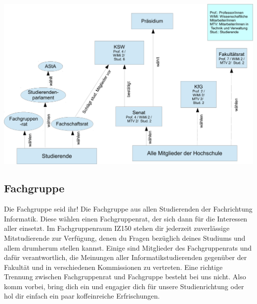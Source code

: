 \begin{center}
	\includegraphics[angle=90]{bilder/gremienkunde3}
\end{center}
\newpage
\subsection{Fachgruppe}
	\label{fachgruppe}
	Die Fachgruppe seid ihr! Die Fachgruppe aus allen Studierenden der Fachrichtung Informatik. Diese wählen einen Fachgruppenrat, der sich dann für die Interessen aller einsetzt. 
	Im Fachgruppenraum IZ150 stehen dir jederzeit zuverlässige Mitstudierende zur Verfügung, denen du Fragen bezüglich deines Studiums und allem drumherum stellen kannst. Einige sind Mitglieder des Fachgruppenrats und dafür verantwortlich, die Meinungen aller Informatikstudierenden gegenüber der Fakultät und in verschiedenen Kommissionen zu vertreten. Eine richtige Trennung zwischen Fachgruppenrat und Fachgruppe besteht bei uns nicht. Also komm vorbei, bring dich ein und engagier dich für unsere Studienrichtung oder hol dir einfach ein paar koffeinreiche Erfrischungen. 
